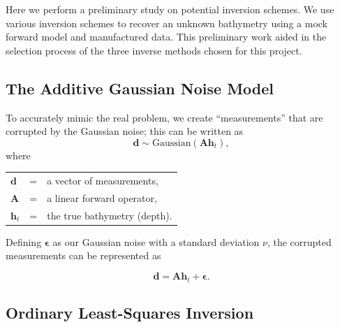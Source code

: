 
Here we perform a preliminary study on potential inversion schemes. We use various inversion schemes to recover an unknown bathymetry using a mock forward model and manufactured data. This preliminary work aided in the selection process of the three inverse methods chosen for this project.

\subsection{The Additive Gaussian Noise Model} \label{Gaussian_noise}
To accurately mimic the real problem, we create ``measurements'' that are corrupted by the Gaussian noise; this can be written as 
\begin{equation}
\mathbf{d} \sim \text{Gaussian}( \mathbf{A} \mathbf{h}_t),
\end{equation}
\vspace{0.3cm}
where\\
\begin{tabular}{l c l}
$\mathbf{d}$ &=& a vector of measurements,\\
$\mathbf{A}$ &=& a linear forward operator,\\
$\mathbf{h}_t$ &=& the true bathymetry (depth). 
\end{tabular}

\vspace{0.3cm}
Defining $\boldsymbol{\epsilon}$ as our Gaussian noise with a standard deviation $\nu$, the corrupted measurements can be represented as

$$
\mathbf{d} = \mathbf{A} \mathbf{h}_t + \boldsymbol{\epsilon}.
$$



\subsection{Ordinary Least-Squares Inversion}


